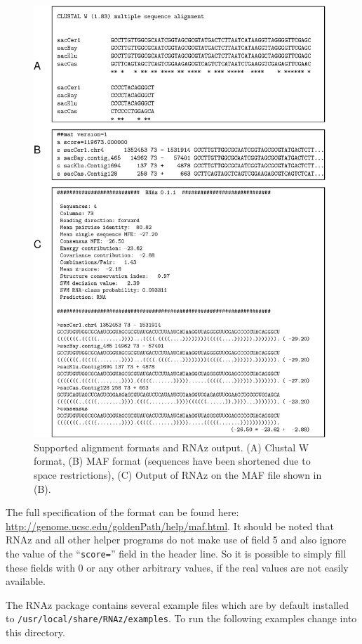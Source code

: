 \documentclass[11pt]{article}
\begin{document}
\begin{figure}
\centerline{\includegraphics*[width=11cm]{figs/formats.eps}}
\caption{Supported alignment formats and RNAz output. (A) Clustal W format,
  (B) MAF format (sequences have been shortened due to space restrictions),
  (C) Output of RNAz on the MAF file shown in (B).}
\label{fig:formats}
\end{figure}



The full specification of the format can be found here:
\url{http://genome.ucsc.edu/goldenPath/help/maf.html}. It should be noted
that RNAz and all other helper programs do not make use of field 5 and also
ignore the value of the ``\texttt{score=}'' field in the header line. So it
is possible to simply fill these fields with 0 or any other arbitrary
values, if the real values are not easily available.

The RNAz package contains several example files which are by
default installed to \texttt{/usr/local/share/RNAz/examples}. To run the
following examples change into this directory.
\end{document}
